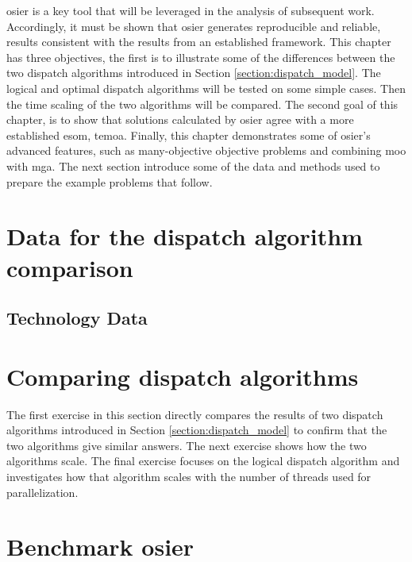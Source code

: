\ac{osier} is a key tool that will be leveraged in the analysis of subsequent
work. Accordingly, it must be shown that \ac{osier} generates reproducible and
reliable, results consistent with the results from an established framework.
This chapter has three objectives, the first is to illustrate some of the
differences between the two dispatch algorithms introduced in Section
\ref{section:dispatch_model}. The logical and optimal dispatch algorithms will
be tested on some simple cases. Then the time scaling of the two algorithms will
be compared. The second goal of this chapter, is to show that solutions
calculated by \ac{osier} agree with a more established \ac{esom}, \ac{temoa}.
Finally, this chapter demonstrates some of \ac{osier}'s advanced features, such
as many-objective objective problems and combining \ac{moo} with \ac{mga}.
The next section introduce some of the data and methods used to prepare the 
example problems that follow.

\section{Data for the dispatch algorithm comparison}
\subsection{Technology Data}


\section{Comparing dispatch algorithms}
The first exercise in this section directly compares the results of two dispatch algorithms
introduced in Section \ref{section:dispatch_model} to confirm that the two algorithms
give similar answers. The next exercise shows how the two algorithms scale. The final exercise
focuses on the logical dispatch algorithm and investigates how that algorithm scales with the
number of threads used for parallelization.
% 

\section{Benchmark \ac{osier}}




